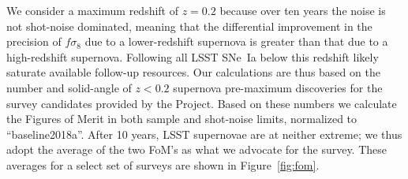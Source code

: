 \documentclass[a4paper,10pt]{article}
\begin{document}
We consider a maximum redshift of $z=0.2$ because over ten years the noise is not shot-noise dominated, meaning that the differential improvement
in the precision of
$f\sigma_8$ due to a lower-redshift supernova is greater than that due to a high-redshift supernova.  Following all LSST SNe~Ia below this redshift 
likely saturate available follow-up resources.
Our calculations are thus based on the number and solid-angle of $z<0.2$ supernova pre-maximum discoveries 
for the survey candidates provided by the Project.  Based on these numbers we calculate the Figures of Merit in
both sample and shot-noise limits, normalized to ``baseline2018a''.
After 10 years,
LSST supernovae are at neither extreme; we thus adopt the average of the two FoM's as what we advocate for the survey.
These averages for a select set of surveys are shown in Figure~\ref{fig:fom}.
\end{document}
